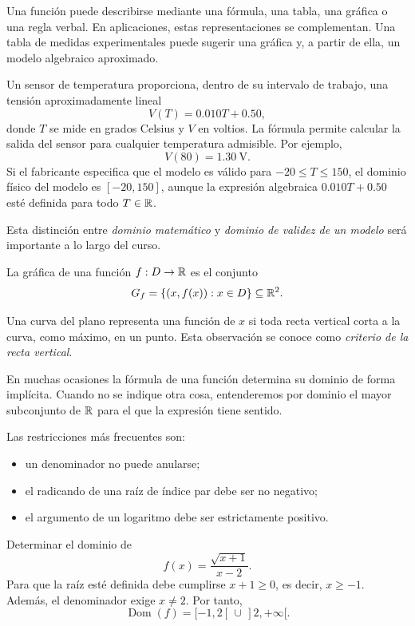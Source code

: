 Una función puede describirse mediante una fórmula, una tabla, una gráfica o una regla verbal. En aplicaciones, estas representaciones se complementan. Una tabla de medidas experimentales puede sugerir una gráfica y, a partir de ella, un modelo algebraico aproximado.

\begin{example}
Un sensor de temperatura proporciona, dentro de su intervalo de trabajo, una tensión aproximadamente lineal
\[
V(T)=0.010T+0.50,
\]
donde $T$ se mide en grados Celsius y $V$ en voltios. La fórmula permite calcular la salida del sensor para cualquier temperatura admisible. Por ejemplo,
\[
V(80)=1.30\ \mathrm{V}.
\]
Si el fabricante especifica que el modelo es válido para $-20\leq T\leq150$, el dominio físico del modelo es $[-20,150]$, aunque la expresión algebraica $0.010T+0.50$ esté definida para todo $T\in\mathbb{R}$.
\end{example}

Esta distinción entre \emph{dominio matemático} y \emph{dominio de validez de un modelo} será importante a lo largo del curso.

\begin{definition}
La gráfica de una función $f:D\to\mathbb{R}$ es el conjunto
\[
G_f=\{(x,f(x)):x\in D\}\subseteq\mathbb{R}^2.
\]
\end{definition}

Una curva del plano representa una función de $x$ si toda recta vertical corta a la curva, como máximo, en un punto. Esta observación se conoce como \emph{criterio de la recta vertical}.

En muchas ocasiones la fórmula de una función determina su dominio de forma implícita. Cuando no se indique otra cosa, entenderemos por dominio el mayor subconjunto de $\mathbb{R}$ para el que la expresión tiene sentido.

Las restricciones más frecuentes son:
\begin{itemize}
\item un denominador no puede anularse;
\item el radicando de una raíz de índice par debe ser no negativo;
\item el argumento de un logaritmo debe ser estrictamente positivo.
\end{itemize}

\begin{example}
Determinar el dominio de
\[
f(x)=\frac{\sqrt{x+1}}{x-2}.
\]
Para que la raíz esté definida debe cumplirse $x+1\geq0$, es decir, $x\geq-1$. Además, el denominador exige $x\neq2$. Por tanto,
\[
\operatorname{Dom}(f)=[-1,2[\,\cup\,]2,+\infty[.
\]
\end{example}

